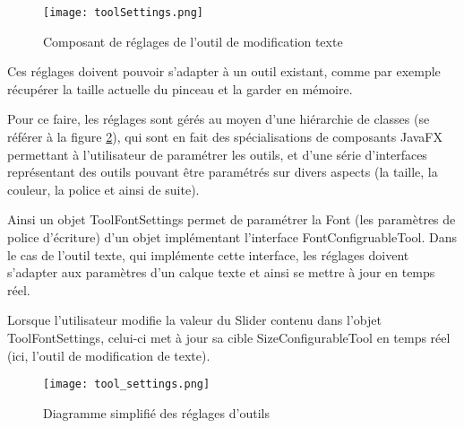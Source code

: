 \begin{figure}[H]
	\caption{Composant de réglages de l'outil de modification texte}
	\centering
	\texttt{[image: toolSettings.png]}
	\label{fig:text_settings}
\end{figure}

\par
Ces réglages doivent pouvoir s'adapter à un outil existant, comme par exemple récupérer la taille actuelle du pinceau et la garder en mémoire.

Pour ce faire, les réglages sont gérés au moyen d'une hiérarchie de classes (se référer à la figure \ref{fig:tool_settings}), qui sont en fait des spécialisations de composants JavaFX permettant à l'utilisateur de paramétrer les outils, et d'une série d'interfaces représentant des outils pouvant être paramétrés sur divers aspects (la taille, la couleur, la police et ainsi de suite).
\par
Ainsi un objet ToolFontSettings permet de paramétrer la Font (les paramètres de police d'écriture) d'un objet implémentant l'interface FontConfigruableTool. Dans le cas de l'outil texte, qui implémente cette interface, les réglages doivent s'adapter aux paramètres d'un calque texte et ainsi se mettre à jour en temps réel.
\par
Lorsque l'utilisateur modifie la valeur du Slider contenu dans l'objet ToolFontSettings, celui-ci met à jour sa cible SizeConfigurableTool en temps réel (ici, l'outil de modification de texte).

\begin{figure}[h]
	\caption{Diagramme simplifié des réglages d'outils}
	\centering
	\texttt{[image: tool\_settings.png]}
	\label{fig:tool_settings}
\end{figure}

